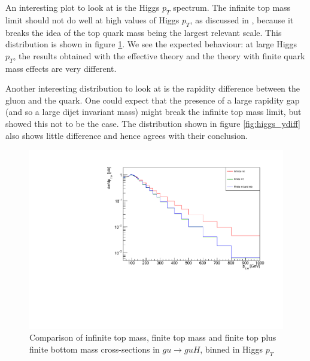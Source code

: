 An interesting plot to look at is the Higgs $p_T$ spectrum. The infinite top mass limit should not do well at high values of Higgs $p_T$, as discussed in \cite{Duca2003}, because it breaks the idea of the top quark mass being the largest relevant scale. This distribution is shown in figure \ref{fig:higgs_pt}. We see the expected behaviour: at large Higgs $p_T$, the results obtained with the effective theory and the theory with finite quark mass effects are very different. 

Another interesting distribution to look at is the rapidity difference between the gluon and the quark. One could expect that the presence of a large rapidity gap (and so a large dijet invariant mass) might break the infinite top mass limit, but \cite{Duca2003} showed this not to be the case. The distribution shown in figure \ref{fig:higgs_ydiff} also shows little difference and hence agrees with their conclusion. 

\begin{figure}[t]
\centering
\includegraphics[scale=0.75]{Images/ptH_gu.pdf}
\caption{Comparison of infinite top mass, finite top mass and finite top plus finite bottom mass cross-sections in $gu \to guH$, binned in Higgs $p_T$ }
\label{fig:higgs_pt}
\end{figure}

